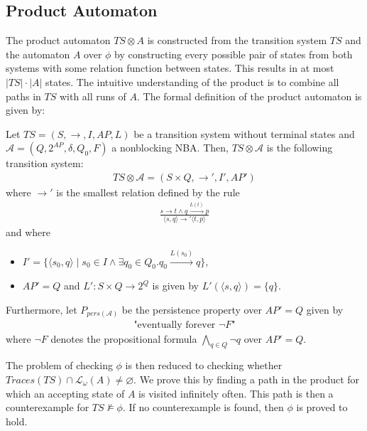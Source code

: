 \subsection{Product Automaton}
\label{sec:product-automaton}
The product automaton $TS \otimes A$ is constructed from the transition system $TS$ and the automaton $A$ over $\phi$ by constructing every possible pair of states from both systems with some relation function between states. This results in at most $|TS|\cdot |A|$ states. The intuitive understanding of the product is to combine all paths in $TS$ with all runs of $A$. The formal definition of the product automaton is given by:
\begin{definition}
Let $TS=\left( S, \longrightarrow, I, AP, L \right)$ be a transition system without terminal states and $\mathcal{A}=\left( Q, 2^{AP}, \delta, Q_0, F \right)$ a nonblocking NBA. Then, $TS \otimes \mathcal{A}$ is the following transition system:
\begin{align*}
    TS \otimes \mathcal{A} = \left( S \times Q, \longrightarrow', I', AP' \right)
\end{align*}
where $\longrightarrow'$ is the smallest relation defined by the rule
\begin{align*}
    \frac{s \longrightarrow t \land q \xrightarrow{L(t)} p}{ \langle s, q \rangle \longrightarrow' \langle t, p \rangle}
\end{align*}
and where
\begin{itemize}
    \item $I' = \{ \langle s_0, q \rangle \mid s_0 \in I \land \exists q_0 \in Q_0 . q_0 \xrightarrow{L(s_0)} q \}$,
    \item $AP' = Q$ and $L' : S \times Q \rightarrow 2^Q$ is given by $L'(\langle s, q \rangle) = \{q\}$.
\end{itemize}
Furthermore, let $P_{pers(\mathcal{A})}$ be the persistence property over $AP' = Q$ given by
\begin{align*}
    \text{"eventually forever $\lnot F$"}
\end{align*}
where $\lnot F$ denotes the propositional formula $\bigwedge\limits_{q \in Q} \lnot q$ over $AP' = Q$.
\end{definition}

The problem of checking $\phi$ is then reduced to checking whether $Traces(TS) \cap \mathcal{L_\omega}(A) \neq \varnothing$. We prove this by finding a path in the product for which an accepting state of $A$ is visited infinitely often. This path is then a counterexample for $TS \not\models \phi$. If no counterexample is found, then $\phi$ is proved to hold.

